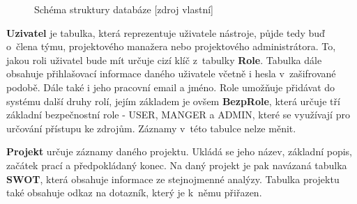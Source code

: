     \begin{figure}[!htbp]
    \begin{center}
    \caption{Schéma struktury databáze [zdroj vlastní]}
    \label{schemaDB}
    \end{center}
    \end{figure}


\textbf{Uzivatel} je tabulka, která reprezentuje uživatele nástroje, půjde tedy buď o~člena týmu, projektového manažera nebo projektového administrátora. To, jakou roli uživatel bude mít určuje cizí klíč z~tabulky \textbf{Role}. Tabulka dále obsahuje přihlašovací informace daného uživatele včetně i hesla v~zašifrované podobě. Dále také i jeho pracovní email a jméno. Role umožňuje přidávat do systému další druhy rolí, jejím základem je ovšem \textbf{BezpRole}, která určuje tří základní bezpečnostní role - USER, MANGER a ADMIN, které se využívají pro určování přístupu ke zdrojům. Záznamy v~této tabulce nelze měnit.


\textbf{Projekt} určuje záznamy daného projektu. Ukládá se jeho název, základní popis, začátek prací a předpokládaný konec. Na daný projekt je pak navázaná tabulka \textbf{SWOT}, která obsahuje informace ze stejnojmenné analýzy. Tabulka projektu také obsahuje odkaz na dotazník, který je k~němu přiřazen. 

